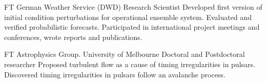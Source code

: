 \documentclass[10pt]{article} %
\begin{document}
\begin{paracol}{2}
{FT} %
{German Weather Service (DWD)} %
{Research Scientist} %
{Developed first version of initial condition perturbations for operational ensemble system.
Evaluated and verified probabilistic forecasts.
Participated in international project meetings and conferences, wrote reports and publications.} 

{FT} %
{Astrophysics Group. University of Melbourne}
{Doctoral and Postdoctoral researcher}
{Proposed turbulent flow as a cause of timing irregularities in pulsars. Discovered timing irregularities in pulsars follow an avalanche process.}

\vspace{-\baselineskip}\medskip %









	
	
%	
	

\end{paracol}
\end{document}
